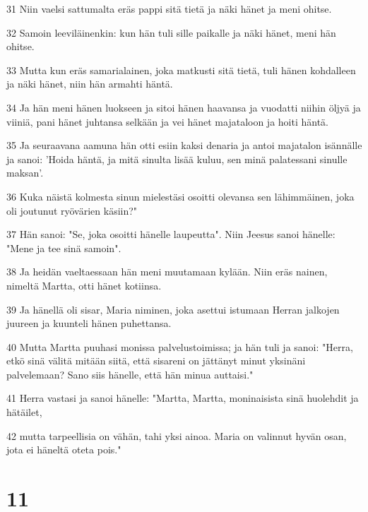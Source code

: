 \par 31 Niin vaelsi sattumalta eräs pappi sitä tietä ja näki hänet ja meni ohitse.
\par 32 Samoin leeviläinenkin: kun hän tuli sille paikalle ja näki hänet, meni hän ohitse.
\par 33 Mutta kun eräs samarialainen, joka matkusti sitä tietä, tuli hänen kohdalleen ja näki hänet, niin hän armahti häntä.
\par 34 Ja hän meni hänen luokseen ja sitoi hänen haavansa ja vuodatti niihin öljyä ja viiniä, pani hänet juhtansa selkään ja vei hänet majataloon ja hoiti häntä.
\par 35 Ja seuraavana aamuna hän otti esiin kaksi denaria ja antoi majatalon isännälle ja sanoi: 'Hoida häntä, ja mitä sinulta lisää kuluu, sen minä palatessani sinulle maksan'.
\par 36 Kuka näistä kolmesta sinun mielestäsi osoitti olevansa sen lähimmäinen, joka oli joutunut ryövärien käsiin?"
\par 37 Hän sanoi: "Se, joka osoitti hänelle laupeutta". Niin Jeesus sanoi hänelle: "Mene ja tee sinä samoin".
\par 38 Ja heidän vaeltaessaan hän meni muutamaan kylään. Niin eräs nainen, nimeltä Martta, otti hänet kotiinsa.
\par 39 Ja hänellä oli sisar, Maria niminen, joka asettui istumaan Herran jalkojen juureen ja kuunteli hänen puhettansa.
\par 40 Mutta Martta puuhasi monissa palvelustoimissa; ja hän tuli ja sanoi: "Herra, etkö sinä välitä mitään siitä, että sisareni on jättänyt minut yksinäni palvelemaan? Sano siis hänelle, että hän minua auttaisi."
\par 41 Herra vastasi ja sanoi hänelle: "Martta, Martta, moninaisista sinä huolehdit ja hätäilet,
\par 42 mutta tarpeellisia on vähän, tahi yksi ainoa. Maria on valinnut hyvän osan, jota ei häneltä oteta pois."

\chapter{11}


